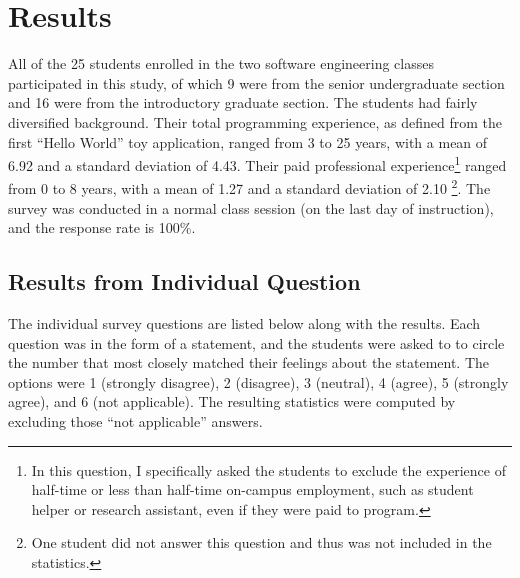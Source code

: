 








\section{Results} \label{EvaluationInClassroom:Results}

All of the 25 students enrolled in the two software engineering classes participated in this study, of which 9 were from the senior undergraduate section and 16 were from the introductory graduate section. The students had fairly diversified background. Their total programming experience, as defined from the first ``Hello World'' toy application, ranged from 3 to 25 years, with a mean of 6.92 and a standard deviation of 4.43. Their paid professional experience\footnote{In this question, I specifically asked the students to exclude the experience of half-time or less than half-time on-campus employment, such as student helper or research assistant, even if they were paid to program.} ranged from 0 to 8 years, with a mean of 1.27 and a standard deviation of 2.10 \footnote{One student did not answer this question and thus was not included in the statistics.}. The survey was conducted in a normal class session (on the last day of instruction), and the response rate is 100\%.


\subsection{Results from Individual Question}

The individual survey questions are listed below along with the results. Each question was in the form of a statement, and the students were asked to to circle the number that most closely matched their feelings about the statement. The options were 1 (strongly disagree), 2 (disagree), 3 (neutral), 4 (agree), 5 (strongly agree), and 6 (not applicable). The resulting statistics were computed by excluding those ``not applicable'' answers.



